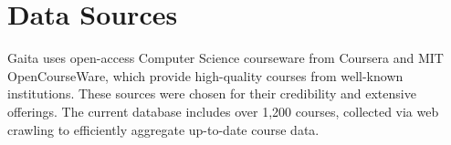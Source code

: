 \section{Data Sources}

Gaita uses open-access Computer Science courseware from Coursera and MIT OpenCourseWare, which provide high-quality courses from well-known institutions. These sources were chosen for their credibility and extensive offerings. The current database includes over 1,200 courses, collected via web crawling to efficiently aggregate up-to-date course data. 

